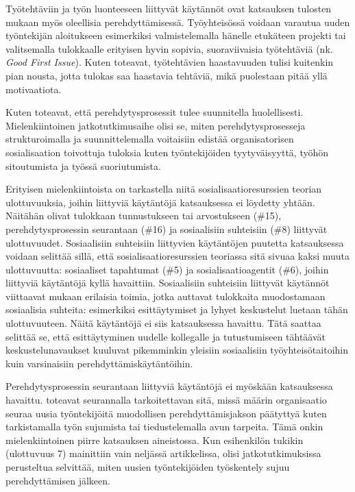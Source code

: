 \documentclass[utf8]{gradu3}
\begin{document}
Työtehtäviin ja työn luonteeseen liittyvät käytännöt ovat katsauksen tulosten mukaan myös oleellisia perehdyttämisessä. Työyhteisössä voidaan varautua uuden työntekijän aloitukseen esimerkiksi valmistelemalla hänelle etukäteen projekti tai valitsemalla tulokkaalle erityisen hyvin sopivia, suoraviivaisia työtehtäviä (nk. \textit{Good First Issue}). Kuten \textcite{ju-ym-2021} toteavat, työtehtävien haastavuuden tulisi kuitenkin pian nousta, jotta tulokas saa haastavia tehtäviä, mikä puolestaan pitää yllä motivaatiota.

Kuten \textcite{britto-ym-2020} toteavat, että perehdytysprosessit tulee suunnitella huolellisesti. Mielenkiintoinen jatkotutkimusaihe olisi se, miten perehdytysprosesseja strukturoimalla ja suunnittelemalla voitaisiin edistää organisatorisen sosialisaation toivottuja tuloksia kuten työntekijöiden tyytyväisyyttä, työhön sitoutumista ja työssä suoriutumista.

Erityisen mielenkiintoista on tarkastella niitä sosialisaatioresurssien teorian ulottuvuuksia, joihin liittyviä käytäntöjä katsauksessa ei löydetty yhtään. Näitähän olivat tulokkaan tunnustukseen tai arvostukseen (\#15), perehdytysprosessin seurantaan (\#16) ja sosiaalisiin suhteisiin (\#8) liittyvät ulottuvuudet. Sosiaalisiin suhteisiin liittyvien käytäntöjen puutetta katsauksessa voidaan selittää sillä, että sosialisaatioresurssien teoriassa sitä sivuaa kaksi muuta ulottuvuutta: sosiaaliset tapahtumat (\#5) ja sosialisaatioagentit (\#6), joihin liittyviä käytäntöjä kyllä havaittiin. Sosiaalisiin suhteisiin liittyvät käytännöt viittaavat \textcite{wanberg-2012} mukaan erilaisia toimia, jotka auttavat tulokkaita muodostamaan sosiaalisia suhteita: esimerkiksi esittäytymiset ja lyhyet keskustelut luetaan tähän ulottuvuuteen. Näitä käytäntöjä ei siis katsauksessa havaittu. Tätä saattaa selittää se, että esittäytyminen uudelle kollegalle ja tutustumiseen tähtäävät keskustelunavaukset kuuluvat pikemminkin yleisiin sosiaalisiin työyhteisötaitoihin kuin varsinaisiin perehdyttämiskäytäntöihin. 

Perehdytysprosessin seurantaan liittyviä käytäntöjä ei myöskään katsauksessa havaittu. \textcite{wanberg-2012} toteavat seurannalla tarkoitettavan sitä, missä määrin organisaatio seuraa uusia työntekijöitä muodollisen perehdyttämisjakson päätyttyä kuten tarkistamalla työn sujumista tai tiedustelemalla avun tarpeita. Tämä onkin mielenkiintoinen piirre katsauksen aineistossa. Kun esihenkilön tukikin (ulottuvuus 7) mainittiin vain neljässä artikkelissa, olisi jatkotutkimuksissa perusteltua selvittää, miten uusien työntekijöiden työskentely sujuu perehdyttämisen jälkeen.
\end{document}
